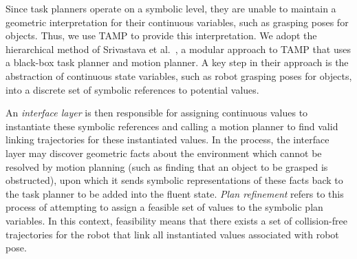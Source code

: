 

Since task planners operate on a symbolic level,
they are unable to maintain a geometric interpretation for their continuous variables, such
as grasping poses for objects. Thus, we use TAMP to provide this interpretation. We adopt the hierarchical method of
Srivastava et al.~\cite{srivastava2014combined}, a modular approach to TAMP
that uses a black-box task planner and motion planner. A key step in their approach is the
abstraction of continuous state variables, such as robot grasping poses for objects, into a
discrete set of symbolic references to potential values.

An \emph{interface layer} is then responsible
for assigning continuous values to instantiate these symbolic references and calling a motion planner to find valid
linking trajectories for these instantiated values. In the process, the interface layer may discover
geometric facts about the environment which cannot be resolved by motion planning (such as finding that an object
to be grasped is obstructed), upon which it sends symbolic representations of these facts back to
the task planner to be added into the fluent state. \emph{Plan refinement} refers to this process
of attempting to assign a feasible set of values to the symbolic plan variables. In this context, feasibility
means that there exists a set of collision-free trajectories for the robot that link all instantiated
values associated with robot pose.

